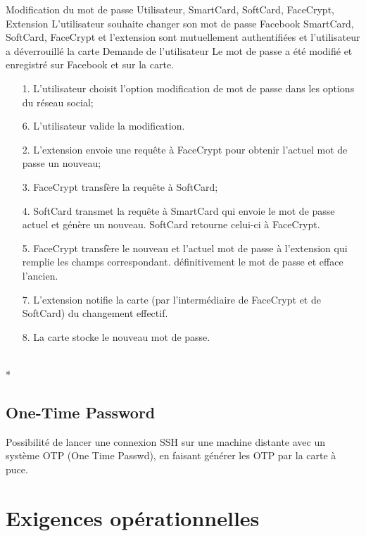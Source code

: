 \documentclass[a4paper,11pt,french]{article}
\begin{document}
\fiche
{Modification du mot de passe}
	{Utilisateur, SmartCard, SoftCard, FaceCrypt, Extension}
    {L'utilisateur souhaite changer son mot de passe Facebook}
    {SmartCard, SoftCard, FaceCrypt et l'extension sont mutuellement 
        authentifiées et l'utilisateur a déverrouillé la carte}
    {Demande de l'utilisateur}
    {Le mot de passe a été modifié et enregistré sur Facebook et sur la carte.}
    {\begin{itemize}
        \item[]
        \item[1.] L'utilisateur choisit l'option modification de mot de passe
        dans les options du réseau social;
        \item[6.] L'utilisateur valide la modification.
    \end{itemize}}
	{\begin{itemize}
        \item[]
        \item[2.] L'extension envoie une requête à FaceCrypt pour obtenir
        l'actuel mot de passe un nouveau;
        \item[3.] FaceCrypt transfère la requête à SoftCard;
        \item[4.] SoftCard transmet la requête à SmartCard qui envoie le mot
            de passe actuel et génère un nouveau. SoftCard retourne celui-ci 
            à FaceCrypt.
        \item[5.] FaceCrypt transfère le nouveau et l'actuel  mot de passe à 
        l'extension qui remplie les champs correspondant.
            définitivement le mot de passe et efface l'ancien.
        \item[7.] L'extension notifie la carte (par l'intermédiaire de FaceCrypt
            et de SoftCard) du changement effectif.
        \item[8.] La carte stocke le nouveau mot de passe.
	\end{itemize}
	}
	{}
\flots
    {}
    {}
\\*

\subsection{One-Time Password}

Possibilité de lancer une connexion SSH sur une machine distante avec un
système OTP (One Time Passwd), en faisant générer les OTP par la carte à puce. 


\section{Exigences opérationnelles}
\end{document}
